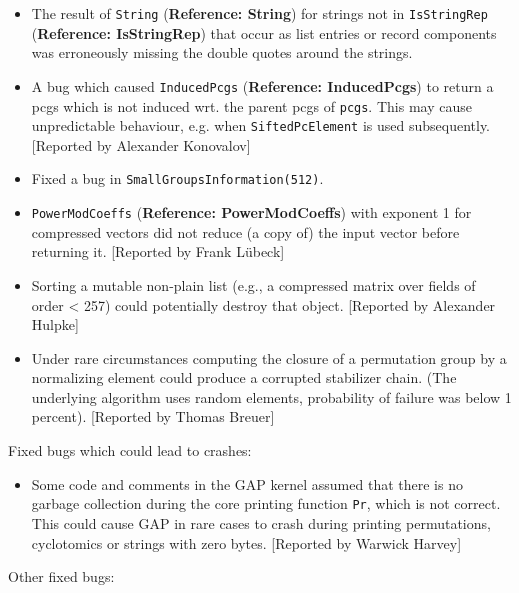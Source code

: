 \documentclass[a4paper,11pt]{report}
\begin{document}
{{\begin{itemize}
 The library code still contained parts of the handling of completion files for
packages, which does not work and therefore had already been removed from the
documentation. This code has now been removed. 

 Now a new component \texttt{PreloadFile} is supported in \texttt{The PackageInfo.g File} (\textbf{Reference: The PackageInfo.g File}) files; if it is bound then the file in question is read immediately before the
package or its documentation is loaded. 
\item  The result of \texttt{String} (\textbf{Reference: String}) for strings not in \texttt{IsStringRep} (\textbf{Reference: IsStringRep}) that occur as list entries or record components was erroneously missing the
double quotes around the strings. 
\item  A bug which caused \texttt{InducedPcgs} (\textbf{Reference: InducedPcgs}) to return a pcgs which is not induced wrt. the parent pcgs of \texttt{pcgs}. This may cause unpredictable behaviour, e.{\nobreakspace}g. when \texttt{SiftedPcElement} is used subsequently. [Reported by Alexander Konovalov] 
\item  Fixed a bug in \texttt{SmallGroupsInformation(512)}. 
\item  \texttt{PowerModCoeffs} (\textbf{Reference: PowerModCoeffs}) with exponent 1 for compressed vectors did not reduce (a copy of) the input
vector before returning it. [Reported by Frank L{\"u}beck] 
\item  Sorting a mutable non-plain list (e.g., a compressed matrix over fields of
order {\textless} 257) could potentially destroy that object. [Reported by
Alexander Hulpke] 
\item  Under rare circumstances computing the closure of a permutation group by a
normalizing element could produce a corrupted stabilizer chain. (The
underlying algorithm uses random elements, probability of failure was below 1
percent). [Reported by Thomas Breuer] 
\end{itemize}
 Fixed bugs which could lead to crashes: 
\begin{itemize}
\item  Some code and comments in the \textsf{GAP} kernel assumed that there is no garbage collection during the core printing
function \texttt{Pr}, which is not correct. This could cause \textsf{GAP} in rare cases to crash during printing permutations, cyclotomics or strings
with zero bytes. [Reported by Warwick Harvey] 
\end{itemize}
 Other fixed bugs: 
\begin{itemize}

\end{itemize}}}
\end{document}
